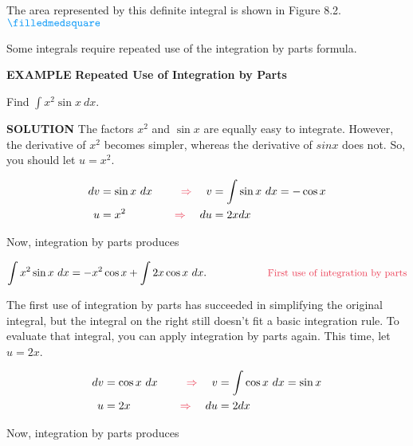 \documentclass[12pt]{article}
\begin{document}
\noindent The area represented by this definite integral is shown in Figure 8.2. \hspace{4cm} $\color{myblue} \filledmedsquare$

\vspace{1cm}

Some integrals require repeated use of the integration by parts formula. 

\bigskip

\sffamily
\noindent \color{myblue} \large \textbf{EXAMPLE} \color{black} \normalsize \textbf{Repeated Use of Integration by Parts}
\rmfamily

\bigskip

\noindent Find $ \displaystyle \int x^2 \sin x \ dx$.

\bigskip

\sffamily
\noindent \color{myblue} \textbf{SOLUTION} \color{black} \rmfamily \hspace{.3cm} The factors $x^2$ and $\sin x$ are equally easy to integrate. However, the derivative of $x^2$ becomes simpler, whereas the derivative of $sin x$ does not. So, you should let $u = x^2$.

\begin{alignat*}{3}
dv &= \sin x \ dx \quad &\color{mypink}\Rightarrow\color{black} \quad  v &= \int \sin x \ dx = -\cos x \\
u &= x^2 &\color{mypink}\Rightarrow\color{black} \quad  du &= 2x dx
\end{alignat*}

\noindent Now, integration by parts produces

$$ \int x^2 \sin x \ dx = -x^2 \cos x + \int 2x \cos x \ dx. \hspace{2cm} \text{\color{mypink}\small First use of integration by parts} $$

\noindent The first use of integration by parts has succeeded in simplifying the original integral, but the integral on the right still doesn't fit a basic integration rule. To evaluate that integral, you can apply integration by parts again. This time, let $u = 2x$.

\begin{alignat*}{3}
dv &= \cos x \ dx \quad &\color{mypink}\Rightarrow\color{black} \quad v &= \int \cos x \ dx = \sin x \\
u &= 2x \quad &\color{mypink}\Rightarrow\color{black} \quad du &= 2 dx
\end{alignat*}

\noindent Now, integration by parts produces
\end{document}
